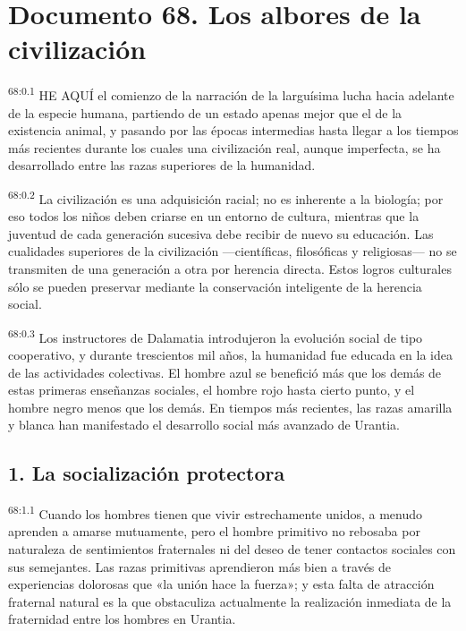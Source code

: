 \chapter{Documento 68. Los albores de la civilización}
\par
\textsuperscript{68:0.1} HE AQUÍ el comienzo de la narración de la larguísima lucha hacia adelante de la especie humana, partiendo de un estado apenas mejor que el de la existencia animal, y pasando por las épocas intermedias hasta llegar a los tiempos más recientes durante los cuales una civilización real, aunque imperfecta, se ha desarrollado entre las razas superiores de la humanidad.

\par
\textsuperscript{68:0.2} La civilización es una adquisición racial; no es inherente a la biología; por eso todos los niños deben criarse en un entorno de cultura, mientras que la juventud de cada generación sucesiva debe recibir de nuevo su educación. Las cualidades superiores de la civilización ---científicas, filosóficas y religiosas--- no se transmiten de una generación a otra por herencia directa. Estos logros culturales sólo se pueden preservar mediante la conservación inteligente de la herencia social.

\par
\textsuperscript{68:0.3} Los instructores de Dalamatia introdujeron la evolución social de tipo cooperativo, y durante trescientos mil años, la humanidad fue educada en la idea de las actividades colectivas. El hombre azul se benefició más que los demás de estas primeras enseñanzas sociales, el hombre rojo hasta cierto punto, y el hombre negro menos que los demás. En tiempos más recientes, las razas amarilla y blanca han manifestado el desarrollo social más avanzado de Urantia.

\section*{1. La socialización protectora}
\par
\textsuperscript{68:1.1} Cuando los hombres tienen que vivir estrechamente unidos, a menudo aprenden a amarse mutuamente, pero el hombre primitivo no rebosaba por naturaleza de sentimientos fraternales ni del deseo de tener contactos sociales con sus semejantes. Las razas primitivas aprendieron más bien a través de experiencias dolorosas que «la unión hace la fuerza»; y esta falta de atracción fraternal natural es la que obstaculiza actualmente la realización inmediata de la fraternidad entre los hombres en Urantia.

